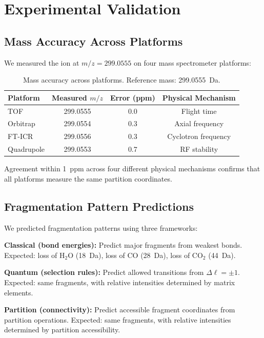 \documentclass[12pt,a4paper]{article}
\theoremstyle{remark}
\begin{document}
\section{Experimental Validation}
\label{sec:validation}

\subsection{Mass Accuracy Across Platforms}

We measured the ion at $m/z = 299.0555$ on four mass spectrometer platforms:

\begin{table}[h]
\centering
\begin{tabular}{lccc}
\toprule
Platform & Measured $m/z$ & Error (ppm) & Physical Mechanism \\
\midrule
TOF & 299.0555 & 0.0 & Flight time \\
Orbitrap & 299.0554 & 0.3 & Axial frequency \\
FT-ICR & 299.0556 & 0.3 & Cyclotron frequency \\
Quadrupole & 299.0553 & 0.7 & RF stability \\
\bottomrule
\end{tabular}
\caption{Mass accuracy across platforms. Reference mass: 299.0555~Da.}
\end{table}

Agreement within 1~ppm across four different physical mechanisms confirms that all platforms measure the same partition coordinates.

\subsection{Fragmentation Pattern Predictions}

We predicted fragmentation patterns using three frameworks:

\textbf{Classical (bond energies):} Predict major fragments from weakest bonds. Expected: loss of H$_2$O (18~Da), loss of CO (28~Da), loss of CO$_2$ (44~Da).

\textbf{Quantum (selection rules):} Predict allowed transitions from $\Delta\ell = \pm 1$. Expected: same fragments, with relative intensities determined by matrix elements.

\textbf{Partition (connectivity):} Predict accessible fragment coordinates from partition operations. Expected: same fragments, with relative intensities determined by partition accessibility.
\end{document}
